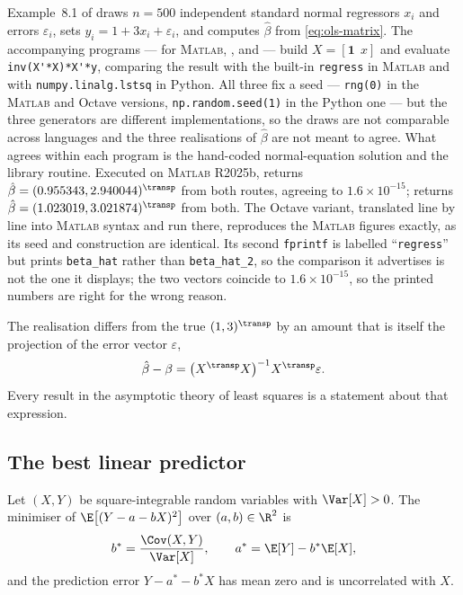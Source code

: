 \begin{eg}\label{eg:ols-simulation}
	Example~8.1 of \textcite{fukuda2026notes}
	\autocite[slides 63--64]{fukuda2026calculus} draws $n=500$ independent standard
	normal regressors $x_i$ and errors $\varepsilon_i$, sets
	$y_i=1+3x_i+\varepsilon_i$, and computes $\hat\beta$ from
	\eqref{eq:ols-matrix}. The accompanying programs
	---  for \textsc{Matlab}, , and
	 --- build $X=[\mathbf1\ \ x]$ and evaluate
	\verb|inv(X'*X)*X'*y|, comparing the result with the built-in
	\verb|regress| in \textsc{Matlab} and with \verb|numpy.linalg.lstsq| in Python.
	All three fix a seed --- \verb|rng(0)| in the \textsc{Matlab} and Octave
	versions, \verb|np.random.seed(1)| in the Python one --- but the three
	generators are different implementations, so the draws are not comparable
	across languages and the three realisations of $\hat\beta$ are not meant to
	agree. What agrees within each program is the hand-coded normal-equation
	solution and the library routine. Executed on \textsc{Matlab} R2025b,
	 returns $\hat\beta=(0.955343,2.940044)^{\transp}$ from
	both routes, agreeing to $1.6\times10^{-15}$; 
	returns $\hat\beta=(1.023019,3.021874)^{\transp}$ from both. The Octave
	variant, translated line by line into \textsc{Matlab} syntax and run there,
	reproduces the \textsc{Matlab} figures exactly, as its seed and construction
	are identical. Its second \verb|fprintf| is labelled ``\verb|regress|'' but
	prints \verb|beta_hat| rather than \verb|beta_hat_2|, so the comparison it
	advertises is not the one it displays; the two vectors coincide to
	$1.6\times10^{-15}$, so the printed numbers are right for the wrong reason.

	The realisation differs from the true $(1,3)^{\transp}$ by an amount that is
	itself the projection of the error vector $\varepsilon$,
	\[
		\hat\beta-\beta=\bigl(X^{\transp}X\bigr)^{-1}X^{\transp}\varepsilon .
	\]
	Every result in the asymptotic theory of least squares is a statement about that
	expression.
\end{eg}

\subsection{The best linear predictor}

\begin{proposition}\label{prop:best-linear-predictor}
	Let $(X,Y)$ be square-integrable random variables with $\Var[X]>0$. The
	minimiser of $\E\bigl[(Y-a-bX)^2\bigr]$ over $(a,b)\in\R^2$ is
	\[
		b^\ast=\frac{\Cov(X,Y)}{\Var[X]},\qquad a^\ast=\E[Y]-b^\ast\E[X],
	\]
	and the prediction error $Y-a^\ast-b^\ast X$ has mean zero and is uncorrelated
	with $X$.
\end{proposition}

